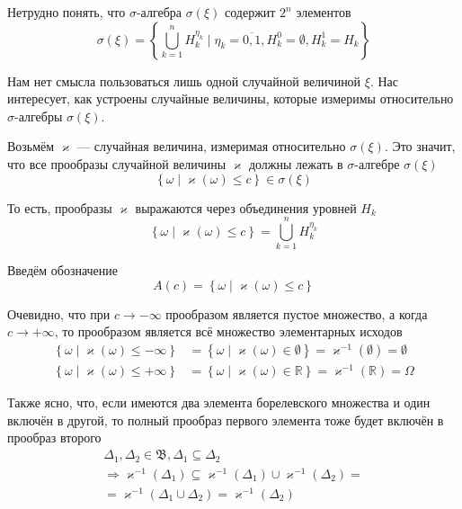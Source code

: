 Нетрудно понять,
что $\sigma$-алгебра $\sigma\left( \xi \right)$ содержит $2^n$ элементов
$$\sigma\left( \xi \right) = \left\{ \bigcup_{k=1}^n H_k^{\eta_k}
    \mid \eta_k = \overline{0,1}, H_k^0 = \emptyset, H_k^1 = H_k \right\}$$

Нам нет смысла пользоваться лишь одной случайной величиной $\xi$.
Нас интересует, как устроены случайные величины,
которые измеримы относительно $\sigma$-алгебры $\sigma\left( \xi \right)$.

Возьмём $\varkappa$ --- случайная величина,
измеримая относительно $\sigma\left( \xi \right)$.
Это значит, что все прообразы случайной величины $\varkappa$ должны лежать в
$\sigma$-алгебре $\sigma\left( \xi \right)$
$$\left\{ \omega \mid \varkappa\left( \omega \right) \le c \right\}
    \in \sigma\left( \xi \right)$$

То есть, прообразы $\varkappa$ выражаются через объединения уровней $H_k$
$$\left\{ \omega \mid \varkappa\left( \omega \right) \le c \right\}
    = \bigcup_{k=1}^n H_k^{\eta_k}$$

Введём обозначение
$$A\left( c \right)
    = \left\{ \omega \mid \varkappa\left( \omega \right) \le c \right\}$$

Очевидно, что при $c\to-\infty$ прообразом является пустое множество,
а когда $c\to+\infty$, то прообразом является всё множество элементарных исходов
\begin{align*}
    \left\{ \omega \mid \varkappa\left( \omega \right) \le -\infty \right\}
        &= \left\{ \omega \mid \varkappa\left(\omega\right)\in\emptyset \right\}
        = \varkappa^{-1}\left( \emptyset \right)
        = \emptyset \\
    \left\{ \omega \mid \varkappa\left( \omega \right) \le +\infty \right\}
        &= \left\{ \omega \mid\varkappa\left(\omega\right)\in\mathbb{R} \right\}
        = \varkappa^{-1}\left( \mathbb{R} \right)
        = \Omega
\end{align*}

Также ясно,
что, если имеются два элемента борелевского множества и один включён в другой,
то полный прообраз первого элемента тоже будет включён в прообраз второго
\begin{align*}
    \Delta_1, \Delta_2 \in \mathfrak{B},
    \Delta_1 \subseteq \Delta_2 \\
    \Rightarrow \varkappa^{-1}\left( \Delta_1 \right)
        \subseteq \varkappa^{-1}\left( \Delta_1 \right)
            \cup \varkappa^{-1}\left( \Delta_2 \right) = \\
        = \varkappa^{-1}\left( \Delta_1 \cup \Delta_2 \right)
        = \varkappa^{-1}\left( \Delta_2 \right)
\end{align*}

